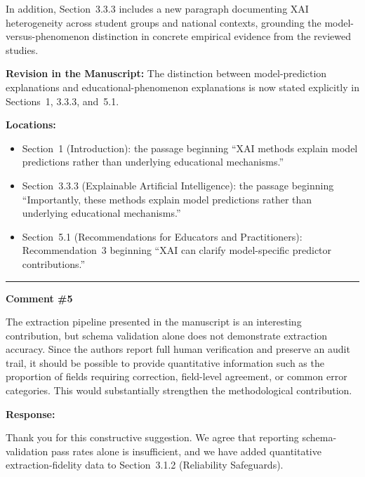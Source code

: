 \documentclass[12pt, a4paper]{article}
\begin{document}
In addition, Section~3.3.3 includes a new paragraph documenting XAI heterogeneity across student
groups and national contexts, grounding the model-versus-phenomenon distinction in concrete empirical
evidence from the reviewed studies.

\medskip
\noindent\textbf{Revision in the Manuscript:}
The distinction between model-prediction explanations and educational-phenomenon explanations is
now stated explicitly in Sections~1, 3.3.3, and~5.1.

\medskip
\noindent\textbf{Locations:}
\begin{itemize}
  \item Section~1 (Introduction): the passage beginning ``XAI methods explain model predictions
        rather than underlying educational mechanisms.''
  \item Section~3.3.3 (Explainable Artificial Intelligence): the passage beginning ``Importantly,
        these methods explain model predictions rather than underlying educational mechanisms.''
  \item Section~5.1 (Recommendations for Educators and Practitioners): Recommendation~3 beginning
        ``XAI can clarify model-specific predictor contributions.''
\end{itemize}

\bigskip\hrule\bigskip

\noindent\textbf{Comment \#5}

\medskip
\noindent\textcolor{reviewerblue}{%
The extraction pipeline presented in the manuscript is an interesting contribution, but schema
validation alone does not demonstrate extraction accuracy. Since the authors report full human
verification and preserve an audit trail, it should be possible to provide quantitative information
such as the proportion of fields requiring correction, field-level agreement, or common error
categories. This would substantially strengthen the methodological contribution.}

\medskip
\noindent\textbf{Response:}

Thank you for this constructive suggestion. We agree that reporting schema-validation pass rates
alone is insufficient, and we have added quantitative extraction-fidelity data to Section~3.1.2
(Reliability Safeguards).
\end{document}
